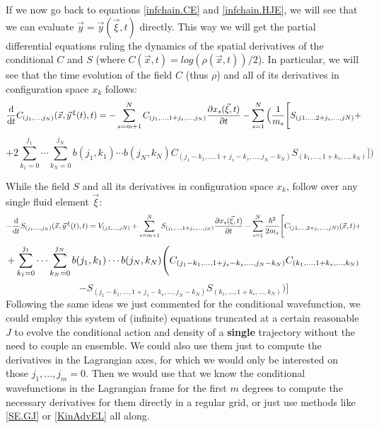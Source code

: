 \documentclass[11pt, a4paper]{article} %
\begin{document}
If we now go back to equations \eqref{infchain.CE} and \eqref{infchain.HJE}, we will see that we can evaluate $\vec{y}=\vec{y}(\vec{\xi},t)$ directly. This way we will get the partial differential equations ruling the dynamics of the spatial derivatives of the conditional $C$ and $S$ (where $C(\vec{x},t)=log(\rho(\vec{x},t))/2$). In particular, we will see that the time evolution of the field $C$ (thus $\rho$) and all of its derivatives in configuration space $x_k$ follows:\vspace{-0.1cm}
\begin{equation}\label{infchain.CE.EL}
\dv{}{t}C_{(j_1,...,j_N)}(\vec{x},\vec{y}^{\, \xi}(t),t)=-\sum_{s=m+1}^N C_{(j_1,...,1+j_s,...,j_N)}\pdv{x_s(\vec{\xi},t)}{t} - \sum_{s=1}^N\Big(\frac{1}{m_s} \Bigg[S_{(j1,...,2+j_s,...,jN)}+
\end{equation}
$$
+2 \sum_{k_1=0}^{j_1}\cdots\sum_{k_N=0}^{j_N} b(j_1,k_1)\cdots b(j_N,k_N)C_{(j_1-k_1,...,1+j_s-k_s,...,j_N-k_N)}S_{(k_1,...,1+k_s,...,k_N)} \Bigg]\bigg)
$$

While the field $S$ and all its derivatives in configuration space $x_k$, follow over any single fluid element $\vec{\xi}$:\vspace{-0.1cm}
\begin{equation}\label{infchain.HJE.EL}
-\dv{}{t}S_{(j_1,...,j_N)}(\vec{x},\vec{y}^{\, \xi}(t),t)=V_{(j1,...,jN)}+\sum_{s=m+1}^N S_{(j_1,...,1+j_s,...,j_N)}\pdv{x_s(\vec{\xi},t)}{t}-\sum_{s=1}^N\frac{\hbar^2}{2m_s} \Bigg[ C_{(j1,...,2+j_s,...,jN)}(\vec{x},t)+\vspace{-0.1cm}
\end{equation}
$$
+\sum_{k_1=0}^{j_1}\cdots\sum_{k_N=0}^{j_N} b(j_1,k_1)\cdots b(j_N,k_N) \Bigg( C_{(j_1-k_1,...,1+j_s-k_s,...,j_N-k_N)}C_{(k_1,...,1+k_s,...,k_N)} \vspace{-0.1cm}
$$
$$
-S_{(j_1-k_1,...,1+j_s-k_s,...,j_N-k_N)}S_{(k_1,...,1+k_s,...,k_N)}  \Bigg)\Bigg]
$$
Following the same ideas we just commented for the conditional wavefunction, we could employ this system of (infinite) equations truncated at a certain reasonable $J$ to evolve the conditional action and density of a {\bf single} trajectory without the need to couple an ensemble. We could also use them just to compute the derivatives in the Lagrangian axes, for which we would only be interested on those $j_1,...,j_m=0$. Then we would use that we know the conditional wavefunctions in the Lagrangian frame for the first $m$ degrees to compute the necessary derivatives for them directly in a regular grid, or just use methods like \eqref{SE.GJ} or \eqref{KinAdvEL} all along.
\end{document}
